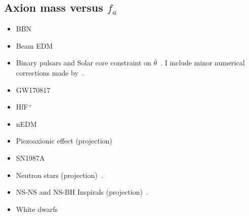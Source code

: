 \documentclass[11pt,twocolumn]{extarticle}
\begin{document}
\newpage


\begin{mdframed}
\vspace{-1em}
\section{Axion mass versus $f_a$}\vspace{-0.5em}
\begin{itemize}\setlength\itemsep{-0.5em}
	\item BBN~\cite{Blum:2014vsa}
	\item Beam EDM~\cite{Schulthess:2022pbp}
	\item Binary pulsars and Solar core constraint on $\bar{\theta}$~\cite{Hook:2017psm}. I include minor numerical corrections made by~\cite{DiLuzio:2021gos,DiLuzio:2021pxd}.
	\item GW170817~\cite{Zhang:2021mks}
	\item HfF$^+$~\cite{Roussy:2020ily}
	\item nEDM~\cite{Abel:2017rtm}
	\item Piezoaxionic effect (projection)~\cite{Arvanitaki:2021wjk}
	\item SN1987A~\cite{Graham:2013gfa}
	\item Neutron stars (projection)~\cite{Hook:2017psm}.
	\item NS-NS and NS-BH Inspirals (projection)~\cite{Hook:2017psm}.
	\item White dwarfs~\cite{Balkin:2022qer}
\end{itemize}
\end{mdframed}
\end{document}
